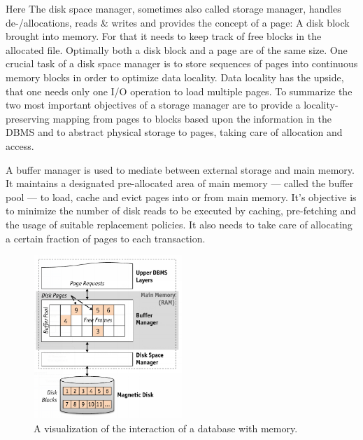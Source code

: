         Here The disk space manager, sometimes also called storage manager, handles de-/allocations, reads \& writes and provides the concept of a page: A disk block brought into memory. 
        For that it needs to keep track of free blocks in the allocated file. Optimally both a disk block and a page are of the same size. 
        One crucial task of a disk space manager is to store sequences of pages into continuous memory blocks in order to optimize data locality.
        Data locality has the upside, that one needs only one I/O operation to load multiple pages.
        To summarize the two most important objectives of a storage manager are to provide a locality-preserving mapping from pages to blocks based upon the information in the DBMS and to abstract physical storage to pages, taking care of allocation and access.
        
        A buffer manager is used to mediate between external storage and main memory. It maintains a designated pre-allocated area of main memory --- called the buffer pool --- to load, cache and evict pages into or from main memory.
        It's objective is to minimize the number of disk reads to be executed by caching, pre-fetching and the usage of suitable replacement policies. 
        It also needs to take care of allocating a certain fraction of pages to each transaction.

        \begin{figure}[htp]\label{dbms_memory}
            \begin{center}
            \includegraphics[keepaspectratio,height=0.4\textheight,width=0.5\textwidth]{img/00_intro/RDBMS_memory_view.png}
            \end{center}
            \caption{A visualization of the interaction of a database with memory.} %
        \end{figure}

